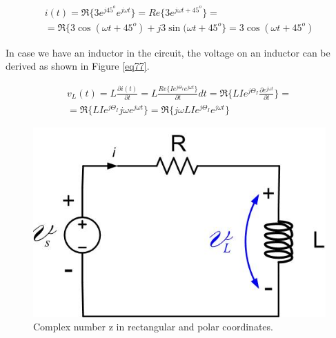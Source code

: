 \documentclass{ximera}
\begin{document}
\begin{eqnarray}
i(t) = \Re\{ 3 e^{j 45^o}  e^{j\omega t} \} =  Re\{3 e^{j \omega t + 45^o}  \} = \nonumber \\ = \Re \{ 3 \cos (\omega t + 45^o ) + j 3 \sin (\omega t + 45^o \} = 3  \cos (\omega t + 45^o ) \label{phtotd}
\end{eqnarray}

In case we have an inductor in the circuit, the voltage on an inductor can be derived as shown in Figure \ref{eq77}. 


\begin{eqnarray}
v_L(t) = L \frac{\partial{ i(t)}}{\partial t}  =L  \frac{ Re\{    I e^{j \Theta_I} e^{j \omega t}\}}{\partial t}  dt  = \Re\{  LI e^{j \Theta_I} \frac{ \partial e^{j \omega t}}{\partial t} \} =  \nonumber \\ = \Re\{  LI e^{j  \Theta_I}  j  \omega e^{j \omega t} \} =  \Re \{  j  \omega       LI e^{j  \Theta_I}    e^{j \omega t}   \}      \label{eq77} 
\end{eqnarray}


\begin{figure}[htbp]
\begin{center}
\includegraphics[scale=0.3]{../jpg/RLnew.jpg}
\end{center}
\caption{Complex number z in rectangular and polar coordinates.}
\label{RLcirc}
\end{figure}
\end{document}
